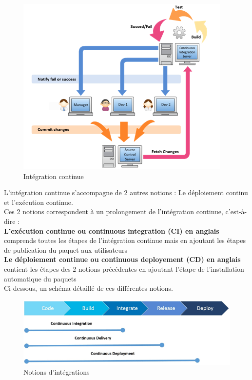 \documentclass[12pt]{article}
\begin{document}
\begin{figure}[ht]
    \centering
    \includegraphics[scale=0.8]{images/IC.png}
    \caption{Intégration continue}
\end{figure}

\newpage
L'intégration continue s'accompagne de 2 autres notions : Le déploiement continu et l'exécution continue.
\\
Ces 2 notions correspondent à un prolongement de l'intégration continue, c'est-à-dire :
\\
\textbf{L'exécution continue ou continuous integration (CI) en anglais} comprends toutes les étapes de l'intégration continue mais en ajoutant les étapes de publication du paquet aux utilisateurs
\\
\textbf{Le déploiement continue ou continuous deployement (CD) en anglais} contient les étapes des 2 notions précédentes en ajoutant l'étape de l'installation automatique du paquets
\\
Ci-dessous, un schéma détaillé de ces différentes notions.
\begin{figure}[ht]
    \centering
    \includegraphics[scale=0.8]{images/IC-plan.png}
    \caption{Notions d'intégrations}
\end{figure}
\end{document}
